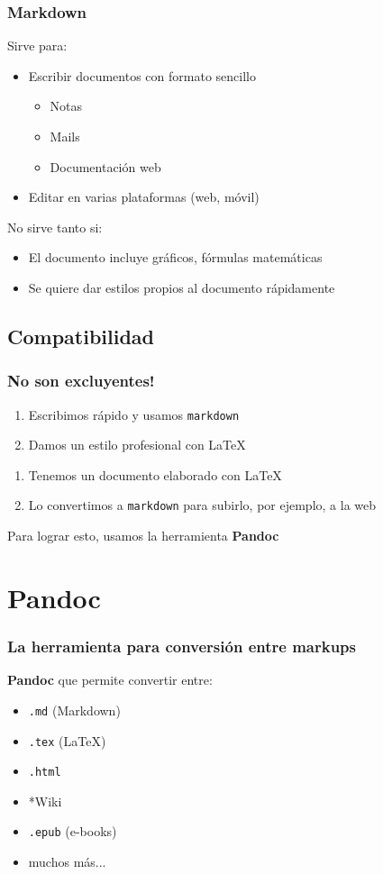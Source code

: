 \documentclass[svgnames]{beamer}
\begin{document}
\begin{frame}
  \frametitle{Markdown}
  Sirve para:
  \begin{itemize}
    \item Escribir documentos con formato sencillo
    \begin{itemize}
      \item Notas
      \item Mails
      \item Documentación web
    \end{itemize}
    \item Editar en varias plataformas (web, móvil)
  \end{itemize}\pause

  \vfill

  No sirve tanto si:
  \begin{itemize}
    \item El documento incluye gráficos, fórmulas matemáticas
    \item Se quiere dar estilos propios al documento rápidamente
  \end{itemize}
\end{frame}

\subsection{Compatibilidad}

\begin{frame}
  \frametitle{No son excluyentes!}
  \begin{enumerate}
    \item Escribimos rápido y usamos \texttt{markdown}
    \item Damos un estilo profesional con \LaTeX
  \end{enumerate}\pause
  \vfill
  \begin{enumerate}
    \item Tenemos un documento elaborado con \LaTeX
    \item Lo convertimos a \texttt{markdown} para subirlo, por ejemplo, a la web
  \end{enumerate}\pause
  \vfill
  Para lograr esto, usamos la herramienta \textbf{Pandoc}
\end{frame}

\section{Pandoc}

\begin{frame}
  \frametitle{La herramienta para conversión entre markups}
  \textbf{Pandoc} que permite convertir entre:
  \begin{itemize}
   \item \texttt{.md} (Markdown)
   \item \texttt{.tex} (\LaTeX)
   \item \texttt{.html}
   \item *Wiki
   \item \texttt{.epub} (e-books)
   \item muchos más...
  \end{itemize}
\end{frame}
\end{document}
